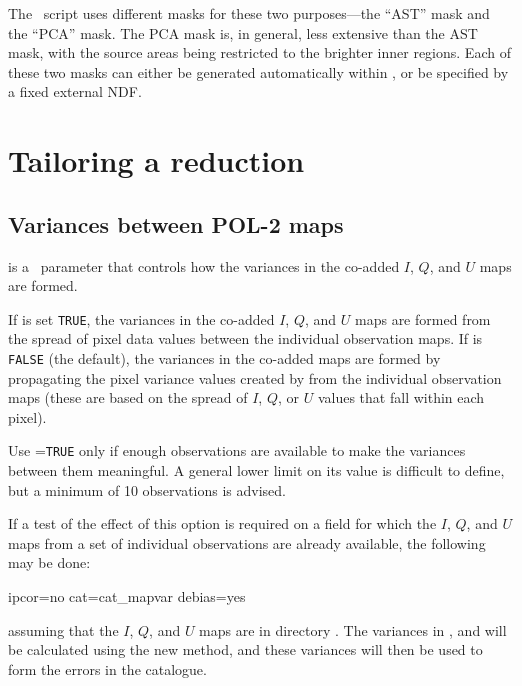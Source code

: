 The \poltwomap\ script uses different masks for these two purposes---the
``AST'' mask and the ``PCA'' mask.  The PCA mask is, in general, less
extensive than the AST mask, with the source areas being restricted to
the brighter inner regions.  Each of these two masks can either be
generated automatically within , or be specified by a fixed
external NDF.



\section{Tailoring a reduction}
\label{sec:tailoredDR}

\subsection*{Variances between POL-2 maps}

 is a \poltwomap\ parameter that controls how the variances in the
co-added $I$, $Q$, and $U$ maps are formed.

If  is set \texttt{TRUE}, the variances in the co-added $I$, $Q$, and $U$ maps
are formed from the spread of pixel data values between the individual
observation maps. If  is \texttt{FALSE} (the default), the variances in
the co-added maps are formed by propagating the pixel variance values
created by  from the individual observation maps (these are
based on the spread of $I$, $Q$, or $U$ values that fall within each pixel).

Use =\texttt{TRUE} only if enough observations are available to make the
variances between them meaningful. A general lower limit on its value
is difficult to define, but a minimum of 10 observations is advised.


If a test of the effect of this option is required on a field for which
the $I$, $Q$, and $U$ maps from a set of individual observations are already
available, the following may be done:

\begin{terminalv}
                   ipcor=no cat=cat_mapvar debias=yes
\end{terminalv}

assuming that the $I$, $Q$, and $U$ maps are in directory . The
variances in ,  and
 will be calculated using the new method, and
these variances will then be used to form the errors in the
 catalogue.

